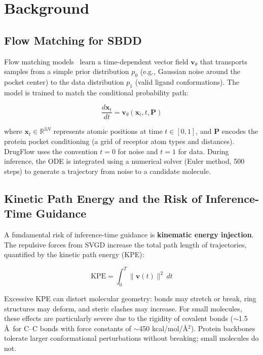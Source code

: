 \documentclass[a4paper,11pt]{article}
\begin{document}
\section{Background}

\subsection{Flow Matching for SBDD}

Flow matching models~\cite{lipman2023flow} learn a time-dependent vector field
$\mathbf{v}_\theta$ that transports samples from a simple prior distribution
$p_0$ (e.g., Gaussian noise around the pocket center) to the data distribution
$p_1$ (valid ligand conformations).  The model is trained to match the
conditional probability path:

\begin{equation}
\frac{d\mathbf{x}_t}{dt} = \mathbf{v}_\theta(\mathbf{x}_t, t, \mathbf{P})
\label{eq:flow_ode}
\end{equation}

where $\mathbf{x}_t \in \mathbb{R}^{3N}$ represents atomic positions at time $t
\in [0, 1]$, and $\mathbf{P}$ encodes the protein pocket conditioning (a grid of
receptor atom types and distances).  DrugFlow uses the convention $t=0$ for noise
and $t=1$ for data.  During inference, the ODE is integrated using a numerical
solver (Euler method, 500 steps) to generate a trajectory from noise to a
candidate molecule.

\subsection{Kinetic Path Energy and the Risk of Inference-Time Guidance}

A fundamental risk of inference-time guidance is \textbf{kinematic energy
injection}.  The repulsive forces from SVGD increase the total path length of
trajectories, quantified by the kinetic path energy (KPE):

\begin{equation}
\text{KPE} = \int_0^T \|\mathbf{v}(t)\|^2 \, dt
\label{eq:kpe}
\end{equation}

Excessive KPE can distort molecular geometry: bonds may stretch or break, ring
structures may deform, and steric clashes may increase.  For small molecules,
these effects are particularly severe due to the rigidity of covalent bonds
($\sim$1.5\,\AA\ for C--C bonds with force constants of $\sim$450
kcal/mol/\AA$^2$).  Protein backbones tolerate larger conformational perturbations
without breaking; small molecules do not.
\end{document}
